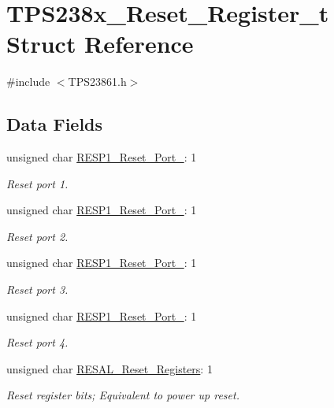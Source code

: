 \hypertarget{struct_t_p_s238x___reset___register__t}{\section{T\-P\-S238x\-\_\-\-Reset\-\_\-\-Register\-\_\-t Struct Reference}
\label{struct_t_p_s238x___reset___register__t}
}


{\ttfamily \#include $<$T\-P\-S23861.\-h$>$}

\subsection*{Data Fields}
\begin{DoxyCompactItemize}
\item 
unsigned char \hyperlink{struct_t_p_s238x___reset___register__t_a5bcee8c1cd44415f485845eb7964f2ae}{R\-E\-S\-P1\-\_\-\-Reset\-\_\-\-Port\-\_}\-: 1
\begin{DoxyCompactList}\small\item\em Reset port 1. \end{DoxyCompactList}\item 
unsigned char \hyperlink{struct_t_p_s238x___reset___register__t_ad5f09b2704d684ae547215218791bbad}{R\-E\-S\-P1\-\_\-\-Reset\-\_\-\-Port\-\_}\-: 1
\begin{DoxyCompactList}\small\item\em Reset port 2. \end{DoxyCompactList}\item 
unsigned char \hyperlink{struct_t_p_s238x___reset___register__t_a46d253541c9691222b3a5382f9f57442}{R\-E\-S\-P1\-\_\-\-Reset\-\_\-\-Port\-\_}\-: 1
\begin{DoxyCompactList}\small\item\em Reset port 3. \end{DoxyCompactList}\item 
unsigned char \hyperlink{struct_t_p_s238x___reset___register__t_ac65e7d88e6728a818a270f4e7d82a269}{R\-E\-S\-P1\-\_\-\-Reset\-\_\-\-Port\-\_}\-: 1
\begin{DoxyCompactList}\small\item\em Reset port 4. \end{DoxyCompactList}\item 
unsigned char \hyperlink{struct_t_p_s238x___reset___register__t_ad0b5086b9fae842561d092c1ef650295}{R\-E\-S\-A\-L\-\_\-\-Reset\-\_\-\-Registers}\-: 1
\begin{DoxyCompactList}\small\item\em Reset register bits; Equivalent to power up reset. \end{DoxyCompactList}\item 

\end{DoxyCompactItemize}
